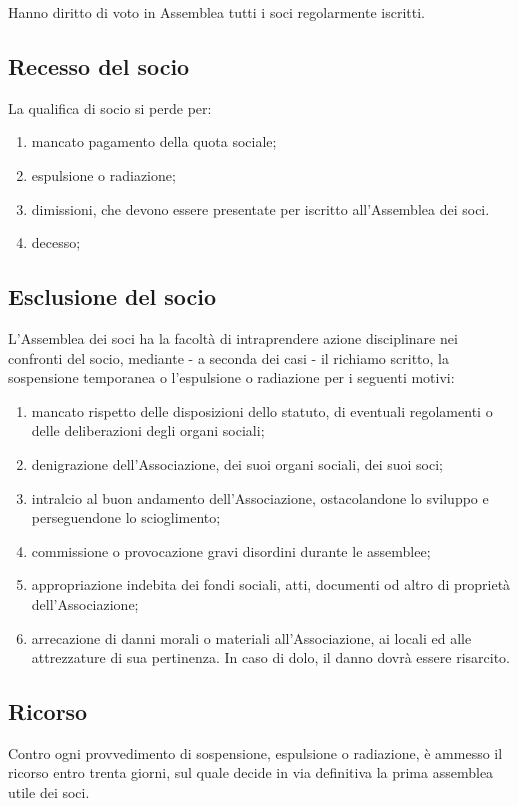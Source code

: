 \documentclass[a4paper,11pt,oneside]{article}
\begin{document}
Hanno diritto di voto in Assemblea tutti i soci regolarmente iscritti.

\subsection{Recesso del socio}
La qualifica di socio si perde per:

\begin{enumerate}
 \item  mancato pagamento della quota sociale; 
 \item  espulsione o radiazione; 
 \item  dimissioni, che devono essere presentate per iscritto all'Assemblea dei soci. 
 \item  decesso; 
\end{enumerate}

\subsection{Esclusione del socio}
L'Assemblea dei soci ha la facoltà di intraprendere azione disciplinare nei confronti del socio, mediante - a seconda dei casi - il richiamo scritto, la sospensione temporanea o l'espulsione o radiazione per i seguenti motivi:

\begin{enumerate}
 \item  mancato rispetto delle disposizioni dello statuto, di eventuali regolamenti o delle deliberazioni degli organi sociali; 
 \item  denigrazione dell'Associazione, dei suoi organi sociali, dei suoi soci; 
 \item  intralcio al buon andamento dell'Associazione, ostacolandone lo sviluppo e perseguendone lo scioglimento; 
 \item  commissione o provocazione gravi disordini durante le assemblee; 
 \item  appropriazione indebita dei fondi sociali, atti, documenti od altro di proprietà dell'Associazione; 
 \item  arrecazione di danni morali o materiali all'Associazione, ai locali ed alle attrezzature di sua pertinenza. In caso di dolo, il danno dovrà essere risarcito. 
\end{enumerate}

\subsection{Ricorso}
Contro ogni provvedimento di sospensione, espulsione o radiazione, è ammesso il ricorso entro trenta giorni, sul quale decide in via definitiva la prima assemblea utile dei soci.
\end{document}
